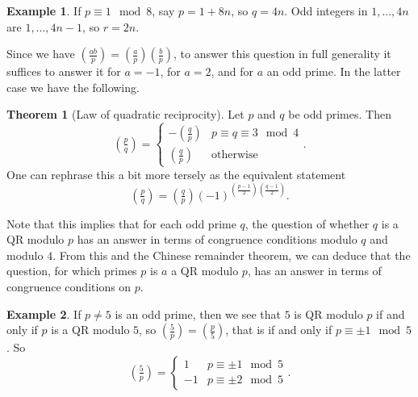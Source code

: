 \documentclass{article}
\newcommand{\rb}[1]{\left( #1 \right)}
\newcommand{\legendre}[2]{\rb{\tfrac{#1}{#2}}}
\theoremstyle{definition}\newtheorem{definition}{Definition}
\theoremstyle{definition}\newtheorem{remark}[definition]{Remark}
\theoremstyle{definition}\newtheorem*{example}{Example}
\theoremstyle{definition}\newtheorem*{note}{Note}
\newtheorem{theorem}[definition]{Theorem}
\begin{document}
\begin{example}
If $ p \equiv 1 \mod 8 $, say $ p = 1 + 8n $, so $ q = 4n $. Odd integers in $ 1, \dots, 4n $ are $ 1, \dots, 4n - 1 $, so $ r = 2n $.
\end{example}

Since we have $ \legendre{ab}{p} = \legendre{a}{p}\legendre{b}{p} $, to answer this question in full generality it suffices to answer it for $ a = -1 $, for $ a = 2 $, and for $ a $ an odd prime. In the latter case we have the following.

\begin{theorem}[Law of quadratic reciprocity]
Let $ p $ and $ q $ be odd primes. Then
$$ \legendre{p}{q} = \begin{cases} -\legendre{q}{p} & p \equiv q \equiv 3 \mod 4 \\ \legendre{q}{p} & \text{otherwise} \end{cases}. $$
One can rephrase this a bit more tersely as the equivalent statement
$$ \legendre{p}{q} = \legendre{q}{p}\rb{-1}^{\rb{\tfrac{p - 1}{2}}\rb{\tfrac{q - 1}{2}}}. $$
\end{theorem}

Note that this implies that for each odd prime $ q $, the question of whether $ q $ is a QR modulo $ p $ has an answer in terms of congruence conditions modulo $ q $ and modulo $ 4 $. From this and the Chinese remainder theorem, we can deduce that the question, for which primes $ p $ is $ a $ a QR modulo $ p $, has an answer in terms of congruence conditions on $ p $.

\begin{example}
If $ p \ne 5 $ is an odd prime, then we see that $ 5 $ is QR modulo $ p $ if and only if $ p $ is a QR modulo $ 5 $, so $ \legendre{5}{p} = \legendre{p}{5} $, that is if and only if $ p \equiv \pm 1 \mod 5 $. So
$$ \legendre{5}{p} = \begin{cases} 1 & p \equiv \pm 1 \mod 5 \\ -1 & p \equiv \pm 2 \mod 5 \end{cases}. $$
\end{example}
\end{document}
